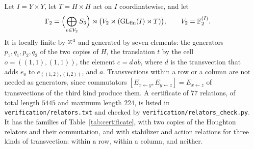 \begin{remark}\label{rem:grid}
Let $I=Y\times Y$, let $T=H\times H$ act on $I$ coordinatewise, and let
\[
\Gamma_2=\Bigl(\bigoplus_{v\in V_2}S_3\Bigr)\rtimes\bigl(V_2\rtimes(\operatorname{GL}_{\rm fin}(I)\rtimes T)\bigr),\qquad V_2=\mathbb F_2^{(I)} .
\]
It is locally finite-by-$\mathbb Z^4$ and generated by seven elements: the generators $p_1,q_1,p_2,q_2$ of the two copies of $H$, the translation $t$
by the cell $o=((1,1),(1,1))$, the element $c=d\,ab$, where $d$ is the transvection that adds $e_o$ to $e_{((1,2),(1,2))}$, and $a$.
Transvections within a row or a column are not needed as generators, since commutators $[E_{x\leftarrow y},E_{y\leftarrow z}]=E_{x\leftarrow z}$
of transvections of the third kind produce them. A certificate of $77$ relations, of total length $5445$ and maximum length $224$, is listed in
\texttt{verification/relators.txt} and checked by \texttt{verification/relators\_check.py}. It has the families of Table~\ref{tab:certificate},
with two copies of the Houghton relators and their commutation, and with stabilizer and action relations for three kinds of transvection: within
a row, within a column, and neither.


\end{remark}
